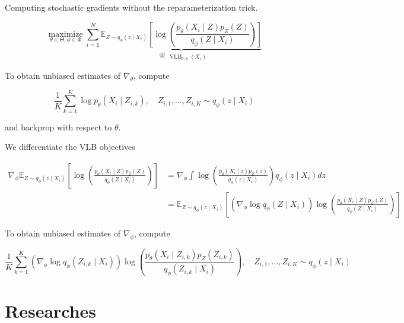\begin{concept}
    Computing stochastic gradients without the reparameterization trick.

    $$
    \underset{\theta \in \Theta, \phi \in \Phi}{\operatorname{maximize}} \sum_{i=1}^{N} \underbrace{\mathbb{E}_{Z \sim q_{\phi}\left(z \mid X_{i}\right)}\left[\log \left(\frac{p_{\theta}\left(X_{i} \mid Z\right) p_{Z}(Z)}{q_{\phi}\left(Z \mid X_{i}\right)}\right)\right]}_{\stackrel{\text { def }}{=} \operatorname{VLB}_{\theta, \phi}\left(X_{i}\right)}
    $$

    To obtain unbiased estimates of $\nabla_{\theta}$, compute

    $$
    \frac{1}{K} \sum_{k=1}^{K} \log p_{\theta}\left(X_{i} \mid Z_{i, k}\right), \quad Z_{i, 1}, \ldots, Z_{i, K} \sim q_{\phi}\left(z \mid X_{i}\right)
    $$

    and backprop with respect to $\theta$.

    We differentiate the VLB objectives

    $$
    \begin{aligned}
    \nabla_{\phi} \mathbb{E}_{Z \sim q_{\phi}\left(z \mid X_{i}\right)}\left[\log \left(\frac{p_{\theta}\left(X_{i} \mid Z\right) p_{Z}(Z)}{q_{\phi}\left(Z \mid X_{i}\right)}\right)\right] & =\nabla_{\phi} \int \log \left(\frac{p_{\theta}\left(X_{i} \mid z\right) p_{Z}(z)}{q_{\phi}\left(z \mid X_{i}\right)}\right) q_{\phi}\left(z \mid X_{i}\right) d z \\
    & =\mathbb{E}_{Z \sim q_{\phi}\left(z \mid X_{i}\right)}\left[\left(\nabla_{\phi} \log q_{\phi}\left(Z \mid X_{i}\right)\right) \log \left(\frac{p_{\theta}\left(X_{i} \mid Z\right) p_{Z}(Z)}{q_{\phi}\left(Z \mid X_{i}\right)}\right)\right]
    \end{aligned}
    $$

    To obtain unbiased estimates of $\nabla_{\phi}$, compute

    $$
    \frac{1}{K} \sum_{k=1}^{K}\left(\nabla_{\phi} \log q_{\phi}\left(Z_{i, k} \mid X_{i}\right)\right) \log \left(\frac{p_{\theta}\left(X_{i} \mid Z_{i, k}\right) p_{Z}\left(Z_{i, k}\right)}{q_{\phi}\left(Z_{i, k} \mid X_{i}\right)}\right), \quad Z_{i, 1}, \ldots, Z_{i, K} \sim q_{\phi}\left(z \mid X_{i}\right)
    $$
\end{concept}

\section{Researches}

